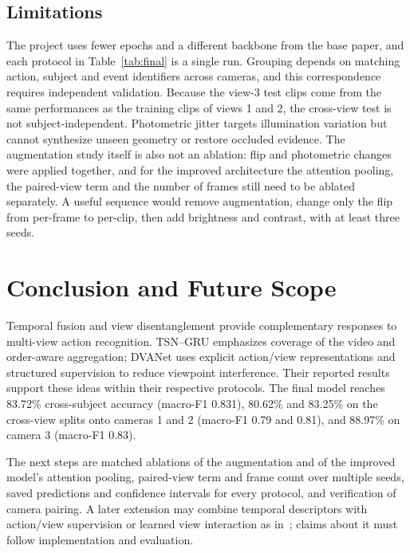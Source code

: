 \documentclass[runningheads]{llncs}
\begin{document}
\subsection{Limitations}
The project uses fewer epochs and a different backbone from the base paper, and each protocol in Table~\ref{tab:final} is a single run. Grouping depends on matching action, subject and event identifiers across cameras, and this correspondence requires independent validation. Because the view-3 test clips come from the same performances as the training clips of views 1 and 2, the cross-view test is not subject-independent. Photometric jitter targets illumination variation but cannot synthesize unseen geometry or restore occluded evidence. The augmentation study itself is also not an ablation: flip and photometric changes were applied together, and for the improved architecture the attention pooling, the paired-view term and the number of frames still need to be ablated separately. A useful sequence would remove augmentation, change only the flip from per-frame to per-clip, then add brightness and contrast, with at least three seeds.

\section{Conclusion and Future Scope}\label{sec:concl}
Temporal fusion and view disentanglement provide complementary responses to multi-view action recognition. TSN--GRU emphasizes coverage of the video and order-aware aggregation; DVANet uses explicit action/view representations and structured supervision to reduce viewpoint interference. Their reported results support these ideas within their respective protocols. The final model reaches 83.72\% cross-subject accuracy (macro-F1 0.831), 80.62\% and 83.25\% on the cross-view splits onto cameras 1 and 2 (macro-F1 0.79 and 0.81), and 88.97\% on camera 3 (macro-F1 0.83).

The next steps are matched ablations of the augmentation and of the improved model's attention pooling, paired-view term and frame count over multiple seeds, saved predictions and confidence intervals for every protocol, and verification of camera pairing. A later extension may combine temporal descriptors with action/view supervision or learned view interaction as in~\cite{cva,tbcnet}; claims about it must follow implementation and evaluation.
\end{document}

